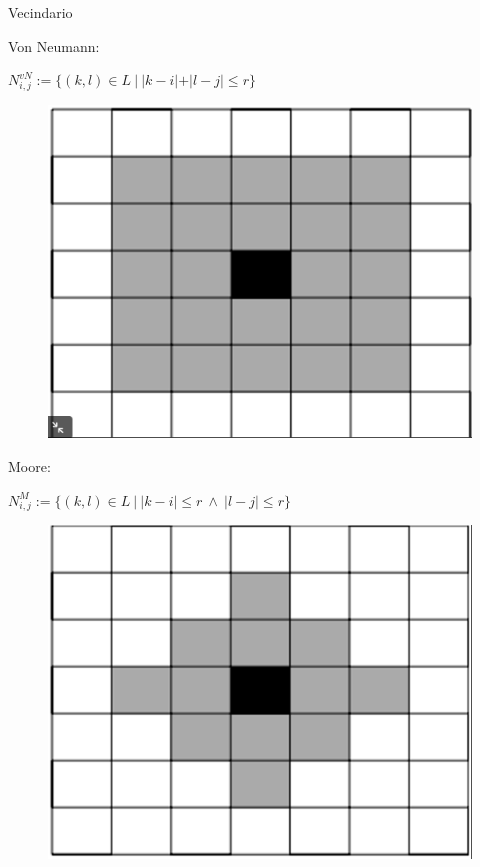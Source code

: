 \begin{frame}{Vecindario}
    \begin{block}{Von Neumann:}
        \begin{multicols}{2}

            $N_{i,j}^{vN}:=\{(k,l) \in L\ |\ |k-i|+ |l - j| \leq r\}$

            \begin{figure}[H]
                \centering
                \includegraphics[width=0.3\linewidth]{pic/01-intro/vn}
            \end{figure}

        \end{multicols}
    \end{block}
    \begin{block}{Moore:}
        \begin{multicols}{2}
            $N_{i,j}^{M}:=\{(k,l) \in L\ |\ |k-i|\leq r\ \wedge \ |l - j| \leq r \}$

            \begin{figure}[H]
                \centering
                \includegraphics[width=0.3\linewidth]{pic/01-intro/moore}
            \end{figure}
        \end{multicols}
    \end{block}
\end{frame}

